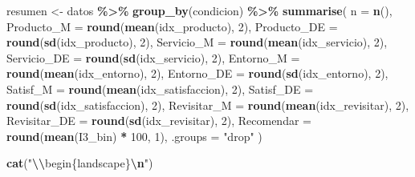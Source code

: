 \documentclass[
  spanish,
]{article}
\newenvironment{Shaded}{\begin{snugshade}}{\end{snugshade}}
\newcommand{\AttributeTok}[1]{\textcolor[rgb]{0.13,0.29,0.53}{#1}}
\newcommand{\DecValTok}[1]{\textcolor[rgb]{0.00,0.00,0.81}{#1}}
\newcommand{\FunctionTok}[1]{\textcolor[rgb]{0.13,0.29,0.53}{\textbf{#1}}}
\newcommand{\NormalTok}[1]{#1}
\newcommand{\OtherTok}[1]{\textcolor[rgb]{0.56,0.35,0.01}{#1}}
\newcommand{\SpecialCharTok}[1]{\textcolor[rgb]{0.81,0.36,0.00}{\textbf{#1}}}
\newcommand{\StringTok}[1]{\textcolor[rgb]{0.31,0.60,0.02}{#1}}
\begin{document}
\begin{Shaded}
\begin{Highlighting}[]
\NormalTok{resumen }\OtherTok{\textless{}{-}}\NormalTok{ datos }\SpecialCharTok{\%\textgreater{}\%}
  \FunctionTok{group\_by}\NormalTok{(condicion) }\SpecialCharTok{\%\textgreater{}\%}
  \FunctionTok{summarise}\NormalTok{(}
    \AttributeTok{n            =} \FunctionTok{n}\NormalTok{(),}
    \AttributeTok{Producto\_M   =} \FunctionTok{round}\NormalTok{(}\FunctionTok{mean}\NormalTok{(idx\_producto), }\DecValTok{2}\NormalTok{),}
    \AttributeTok{Producto\_DE  =} \FunctionTok{round}\NormalTok{(}\FunctionTok{sd}\NormalTok{(idx\_producto), }\DecValTok{2}\NormalTok{),}
    \AttributeTok{Servicio\_M   =} \FunctionTok{round}\NormalTok{(}\FunctionTok{mean}\NormalTok{(idx\_servicio), }\DecValTok{2}\NormalTok{),}
    \AttributeTok{Servicio\_DE  =} \FunctionTok{round}\NormalTok{(}\FunctionTok{sd}\NormalTok{(idx\_servicio), }\DecValTok{2}\NormalTok{),}
    \AttributeTok{Entorno\_M    =} \FunctionTok{round}\NormalTok{(}\FunctionTok{mean}\NormalTok{(idx\_entorno), }\DecValTok{2}\NormalTok{),}
    \AttributeTok{Entorno\_DE   =} \FunctionTok{round}\NormalTok{(}\FunctionTok{sd}\NormalTok{(idx\_entorno), }\DecValTok{2}\NormalTok{),}
    \AttributeTok{Satisf\_M     =} \FunctionTok{round}\NormalTok{(}\FunctionTok{mean}\NormalTok{(idx\_satisfaccion), }\DecValTok{2}\NormalTok{),}
    \AttributeTok{Satisf\_DE    =} \FunctionTok{round}\NormalTok{(}\FunctionTok{sd}\NormalTok{(idx\_satisfaccion), }\DecValTok{2}\NormalTok{),}
    \AttributeTok{Revisitar\_M  =} \FunctionTok{round}\NormalTok{(}\FunctionTok{mean}\NormalTok{(idx\_revisitar), }\DecValTok{2}\NormalTok{),}
    \AttributeTok{Revisitar\_DE =} \FunctionTok{round}\NormalTok{(}\FunctionTok{sd}\NormalTok{(idx\_revisitar), }\DecValTok{2}\NormalTok{),}
    \AttributeTok{Recomendar   =} \FunctionTok{round}\NormalTok{(}\FunctionTok{mean}\NormalTok{(I3\_bin) }\SpecialCharTok{*} \DecValTok{100}\NormalTok{, }\DecValTok{1}\NormalTok{),}
    \AttributeTok{.groups =} \StringTok{"drop"}
\NormalTok{  )}

\FunctionTok{cat}\NormalTok{(}\StringTok{"}\SpecialCharTok{\textbackslash{}\textbackslash{}}\StringTok{begin\{landscape\}}\SpecialCharTok{\textbackslash{}n}\StringTok{"}\NormalTok{)}
\end{Highlighting}
\end{Shaded}
\end{document}
